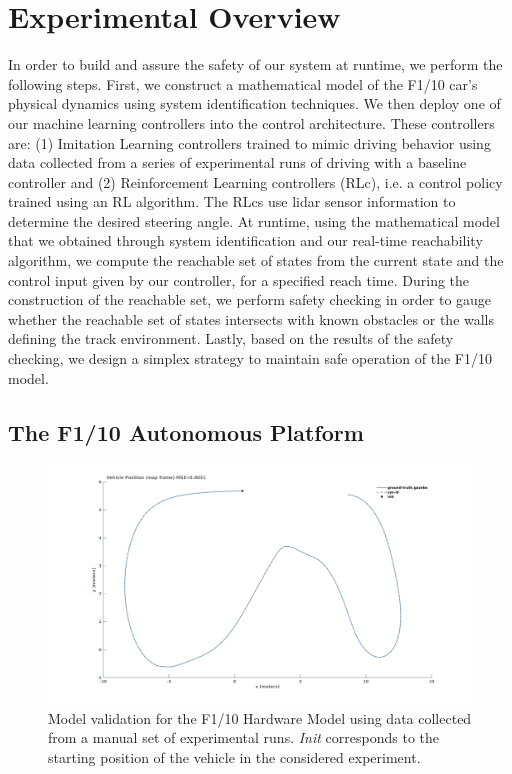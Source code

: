 \documentclass[manuscript,screen,review]{acmart}
\begin{document}
\section{Experimental Overview}

In order to build and assure the safety of our system at runtime, we perform the following steps. First, we construct a mathematical model of the F1/10 car's physical dynamics using system identification techniques. We then deploy one of our machine learning controllers into the control architecture. These controllers are: (1) Imitation Learning controllers trained to mimic driving behavior using data collected from a series of experimental runs of driving with a baseline controller and (2) Reinforcement Learning controllers (RLc), i.e. a control policy trained using an RL algorithm. The RLcs use lidar sensor information to determine the desired steering angle. At runtime, using the mathematical model that we obtained through system identification and our real-time reachability algorithm, we compute the reachable set of states from the current state and the control input given by our controller, for a specified reach time. During the construction of the reachable set, we perform safety checking in order to gauge whether the reachable set of states intersects with known obstacles or the walls defining the track environment. Lastly, based on the results of the safety checking, we design a simplex strategy to maintain safe operation of the F1/10 model. 

\subsection{The F1/10 Autonomous Platform}

\begin{figure}[htbp]%
  \centering
    \includegraphics[width=0.7\linewidth]{figures/validation2.pdf}
  \caption{Model validation for the F1/10 Hardware Model using data collected from a manual set of experimental runs. \emph{Init} corresponds to the starting position of the vehicle in the considered experiment.}
  \label{fig:validation}
\end{figure}%
\end{document}
